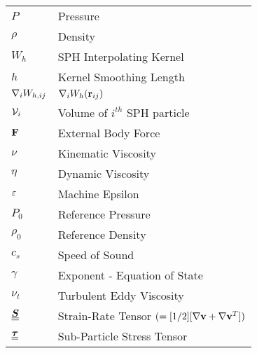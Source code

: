 \begin{longtable}{ll}
$P$                & Pressure                          \\
$\rho$             & Density                           \\
$W_{h}$            & SPH Interpolating Kernel          \\
$h$                & Kernel Smoothing Length           \\
$\nabla_{i} W_{h, ij}$            & $\nabla_i W_h (\mathbf{r}_{ij})$             \\
$\mathcal{V}_i$           & Volume of $i^{th}$ SPH particle   \\
$\mathbf{F}$         & External Body Force               \\
$\nu$              & Kinematic Viscosity               \\
$\eta$             & Dynamic Viscosity                 \\
$\varepsilon$  & Machine Epsilon                   \\
$P_0$              & Reference Pressure                \\
$\rho_0$           & Reference Density                 \\
$c_s$              & Speed of Sound                    \\
$\gamma$           & Exponent - Equation of State      \\
$\nu_t$            & Turbulent Eddy Viscosity          \\
$\underline{\underline{\bm{S}}}$                                     & Strain-Rate Tensor $(=[1/2][\nabla \mathbf{v} + \nabla \mathbf{v}^T])$                          \\
$\underline{\underline{\bm{\tau}}}$    & Sub-Particle Stress Tensor       
\end{longtable}